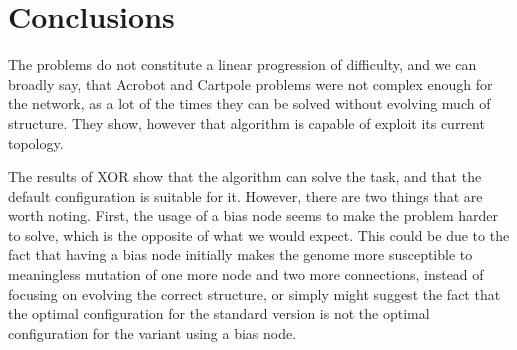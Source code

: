 \documentclass{article}
\begin{document}
\section{Conclusions}
The problems do not constitute a linear progression of 
difficulty, and we can broadly say, that Acrobot and Cartpole problems were not complex enough for the network,
as a lot of the times they can be solved without evolving much of structure. They show, however that algorithm is capable
of exploit its current topology. 

    The results of XOR show that the algorithm can solve the task, and that the default configuration is suitable for it.
    However, there are two things that are worth noting. First, the usage of a bias node seems to make the problem harder to solve, 
    which is the opposite of what we would expect. This could be due to the fact that having a bias node initially 
    makes the genome more susceptible to meaningless mutation of one more node and two more connections,
    instead of focusing on evolving the correct structure, or simply might suggest the fact that the optimal configuration
    for the standard version is not the optimal configuration for the variant using a bias node.
\end{document}
